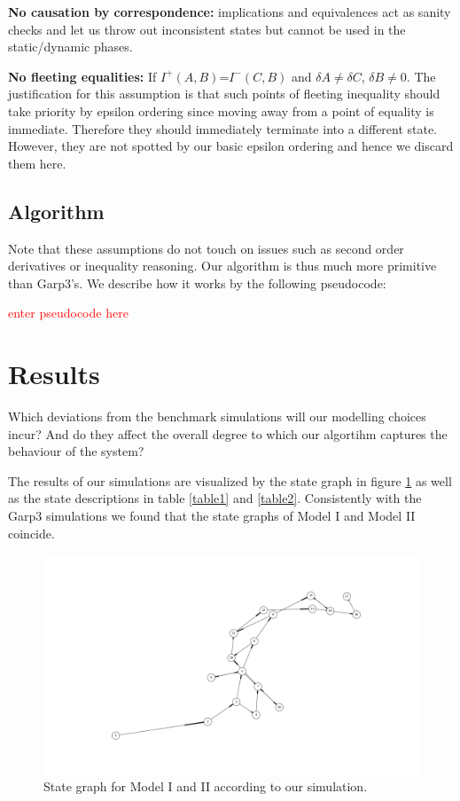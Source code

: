 \documentclass{article}
\begin{document}
\textbf{No causation by correspondence:} implications and equivalences act as sanity checks and let us throw out inconsistent states but cannot be used in the static/dynamic phases.

\textbf{No fleeting equalities:} If $I^+(A,B)$=$I^-(C,B)$ and $\delta A \neq \delta C$, $\delta B \neq 0$. The justification for this assumption is that such points of fleeting inequality should take priority by epsilon ordering since moving away from a point of equality is immediate. Therefore they should immediately terminate into a different state. However, they are not spotted by our basic epsilon ordering and hence we discard them here.

\subsection{Algorithm}

Note that these assumptions do not touch on issues such as second order derivatives or inequality reasoning. Our algorithm is thus much more primitive than Garp3's. We describe how it works by the following pseudocode:

\textcolor{red}{enter pseudocode here}

\section{Results}

Which deviations from the benchmark simulations will our modelling choices incur? And do they affect the overall degree to which our algortihm captures the behaviour of the system? 

The results of our simulations are visualized by the state graph in figure \ref{figure8} as well as the state descriptions in table \ref{table1} and \ref{table2}. Consistently with the Garp3 simulations we found that the state graphs of Model I and Model II coincide.

\begin{figure}
	\includegraphics[scale=0.3]{Ok_State_Graph.png}
	\caption{State graph for Model I and II according to our simulation. }
	\label{figure8}
\end{figure}
\end{document}
